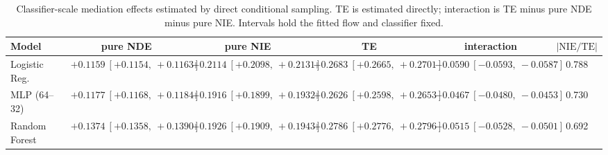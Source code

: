 \begin{table}[htbp]
  \centering
  \caption{Classifier-scale mediation effects estimated by direct conditional sampling. TE is estimated directly; interaction is TE minus pure NDE minus pure NIE. Intervals hold the fitted flow and classifier fixed.}
  \label{tab:bar_gap_overall}
  \begin{tabular}{lccccc}
    \toprule
    Model & pure NDE & pure NIE & TE & interaction & $|\mathrm{NIE}/\mathrm{TE}|$ \\
    \midrule
    Logistic Reg. & $+0.1159\ [+0.1154,\ +0.1163]$ & $+0.2114\ [+0.2098,\ +0.2131]$ & $+0.2683\ [+0.2665,\ +0.2701]$ & $-0.0590\ [-0.0593,\ -0.0587]$ & 0.788 \\
    MLP (64--32) & $+0.1177\ [+0.1168,\ +0.1184]$ & $+0.1916\ [+0.1899,\ +0.1932]$ & $+0.2626\ [+0.2598,\ +0.2653]$ & $-0.0467\ [-0.0480,\ -0.0453]$ & 0.730 \\
    Random Forest & $+0.1374\ [+0.1358,\ +0.1390]$ & $+0.1926\ [+0.1909,\ +0.1943]$ & $+0.2786\ [+0.2776,\ +0.2796]$ & $-0.0515\ [-0.0528,\ -0.0501]$ & 0.692 \\
    \bottomrule
  \end{tabular}
\end{table}